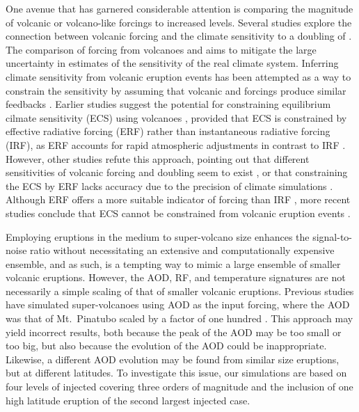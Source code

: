 \documentclass[draft]{agujournal2019}
\newcommand{\iso}[1][i]{{#1}njected \ce{SO2}}
\begin{document}
One avenue that has garnered considerable attention is comparing the magnitude of
volcanic or volcano-like forcings to increased  levels. Several studies explore
the connection between volcanic forcing and the climate sensitivity to a doubling of
\cite{boer2007,marvel2016,merlis2014,ollila2016,richardson2019,salvi2022,wigley2005}.
The comparison of forcing from volcanoes and  aims to mitigate the large
uncertainty in estimates of the sensitivity of the real climate system. Inferring
climate sensitivity from volcanic eruption events has been attempted as a way to
constrain the sensitivity \cite{boer2007} by assuming that volcanic and 
forcings produce similar feedbacks \cite{pauling2023}. Earlier studies suggest the
potential for constraining equilibrium cilmate sensitivity (ECS) using volcanoes
\cite{bender2010}, provided that ECS is constrained by effective radiative forcing (ERF)
rather than instantaneous radiative forcing (IRF), as ERF accounts for rapid atmospheric
adjustments in contrast to IRF \cite{richardson2019}. However, other studies refute this
approach, pointing out that different sensitivities of volcanic forcing and 
doubling seem to exist \cite{douglass2006}, or that constraining the ECS by ERF lacks
accuracy due to the precision of climate simulations \cite{boer2007,salvi2022}. Although
ERF offers a more suitable indicator of forcing than IRF
\cite{marvel2016,richardson2019}, more recent studies conclude that ECS cannot be
constrained from volcanic eruption events \cite{pauling2023}.

Employing eruptions in the medium to super-volcano size enhances the signal-to-noise
ratio without necessitating an extensive and computationally expensive ensemble, and as
such, is a tempting way to mimic a large ensemble of smaller volcanic eruptions.
However, the AOD, RF, and temperature signatures are not necessarily a simple scaling of
that of smaller volcanic eruptions. Previous studies have simulated super-volcanoes
using AOD as the input forcing, where the AOD was that of Mt.\ Pinatubo scaled by a
factor of one hundred \cite{jones2005}. This approach may yield incorrect results, both
because the peak of the AOD may be too small or too big, but also because the evolution
of the AOD could be inappropriate. Likewise, a different AOD evolution may be found from
similar size eruptions, but at different latitudes. To investigate this issue, our
simulations are based on four levels of \iso{} covering three orders of magnitude and
the inclusion of one high latitude eruption of the second largest \iso{} case.
\end{document}
